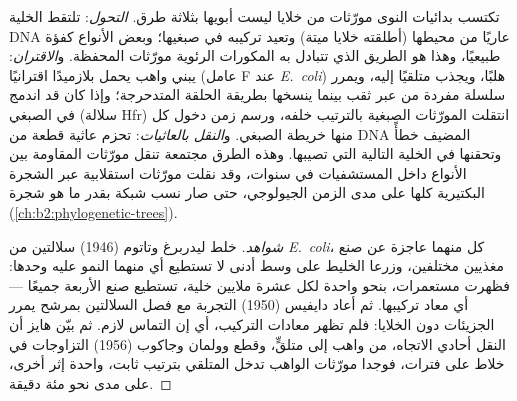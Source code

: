\begin{definition}\label{def:b2:genome-diversification:hgt}
تكتسب بدائيات النوى مورّثات من خلايا ليست أبويها بثلاثة طرق.
\emph{التحول}: تلتقط الخلية DNA عاريًا من محيطها (أطلقته خلايا
ميتة) وتعيد تركيبه في صبغيها؛ وبعض الأنواع كفؤة طبيعيًا، وهذا هو
الطريق الذي تتبادل به المكورات الرئوية مورّثات المحفظة.
و\emph{الاقتران}: يبني واهب يحمل بلازميدًا اقترانيًا (عامل F عند
\emph{E.~coli}) هلبًا، ويجذب متلقيًا إليه، ويمرر سلسلة مفردة من
 عبر ثقب بينما ينسخها بطريقة الحلقة المتدحرجة؛ وإذا كان
 قد اندمج في الصبغي (سلالة Hfr) انتقلت المورّثات الصبغية
بالترتيب خلفه، ورسم زمن دخول كل منها خريطة الصبغي.
و\emph{النقل بالعاثيات}: تحزم عاثية قطعة من DNA المضيف خطأً وتحقنها
في الخلية التالية التي تصيبها. وهذه الطرق مجتمعة تنقل مورّثات
المقاومة بين الأنواع داخل المستشفيات في سنوات، وقد نقلت مورّثات
استقلابية عبر الشجرة البكتيرية كلها على مدى الزمن الجيولوجي، حتى
صار نسب  شبكة بقدر ما هو شجرة
(\cref{ch:b2:phylogenetic-trees}).
\end{definition}
\begin{proof}[شواهد]
خلط ليدربرغ وتاتوم (1946) سلالتين من \emph{E.~coli}، كل منهما عاجزة
عن صنع مغذيين مختلفين، وزرعا الخليط على وسط أدنى لا تستطيع أي منهما
النمو عليه وحدها: فظهرت مستعمرات، بنحو واحدة لكل عشرة ملايين خلية،
تستطيع صنع الأربعة جميعًا --- أي معاد تركيبها. ثم أعاد دايفيس (1950)
التجربة مع فصل السلالتين بمرشح يمرر الجزيئات دون الخلايا: فلم تظهر
معادات التركيب، أي إن التماس لازم. ثم بيّن هايز أن النقل أحادي
الاتجاه، من واهب إلى متلقٍّ، وقطع وولمان وجاكوب (1956) التزاوجات في
خلاط على فترات، فوجدا مورّثات الواهب تدخل المتلقي بترتيب ثابت، واحدة
إثر أخرى، على مدى نحو مئة دقيقة.
\end{proof}

